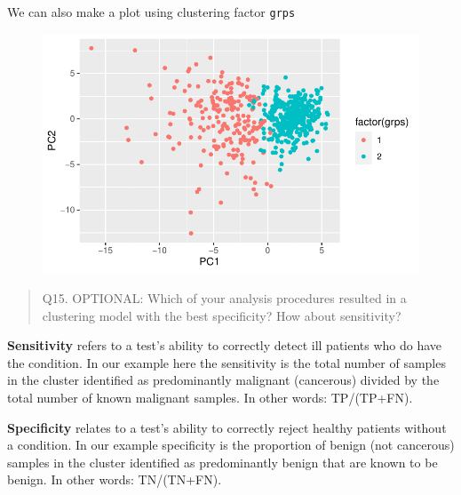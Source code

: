 \documentclass[
  letterpaper,
  DIV=11,
  numbers=noendperiod]{scrartcl}
\newenvironment{Shaded}{\begin{snugshade}}{\end{snugshade}}
\newcommand{\AttributeTok}[1]{\textcolor[rgb]{0.40,0.45,0.13}{#1}}
\newcommand{\FunctionTok}[1]{\textcolor[rgb]{0.28,0.35,0.67}{#1}}
\newcommand{\NormalTok}[1]{\textcolor[rgb]{0.00,0.23,0.31}{#1}}
\newcommand{\SpecialCharTok}[1]{\textcolor[rgb]{0.37,0.37,0.37}{#1}}
\begin{document}
We can also make a plot using clustering factor \texttt{grps}

\begin{Shaded}
\end{Shaded}

\begin{figure}[H]

{\centering \includegraphics{class08_files/figure-pdf/unnamed-chunk-16-1.pdf}

}

\end{figure}

\begin{quote}
Q15. OPTIONAL: Which of your analysis procedures resulted in a
clustering model with the best specificity? How about sensitivity?
\end{quote}

\textbf{Sensitivity} refers to a test's ability to correctly detect ill
patients who do have the condition. In our example here the sensitivity
is the total number of samples in the cluster identified as
predominantly malignant (cancerous) divided by the total number of known
malignant samples. In other words: TP/(TP+FN).

\textbf{Specificity} relates to a test's ability to correctly reject
healthy patients without a condition. In our example specificity is the
proportion of benign (not cancerous) samples in the cluster identified
as predominantly benign that are known to be benign. In other words:
TN/(TN+FN).
\end{document}
